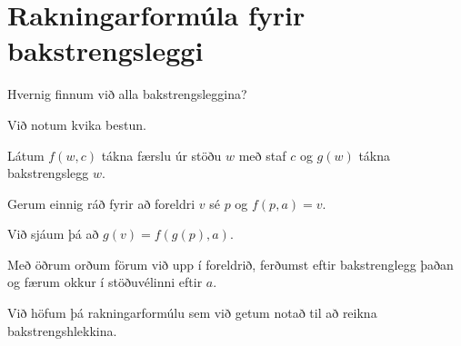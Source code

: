 \section{Rakningarformúla fyrir bakstrengsleggi}
{
    {
        \item<1-> Hvernig finnum við alla bakstrengsleggina?
        \item<2-> Við notum kvika bestun.
        \item<3-> Látum $f(w, c)$ tákna færslu úr stöðu $w$ með staf $c$ og $g(w)$ tákna bakstrengslegg $w$.
        \item<4-> Gerum einnig ráð fyrir að foreldri $v$ sé $p$ og $f(p, a) = v$.
        \item<5-> Við sjáum þá að $g(v) = f(g(p), a)$.
        \item<6-> Með öðrum orðum förum við upp í foreldrið, ferðumst eftir bakstrenglegg þaðan og færum okkur í stöðuvélinni eftir $a$.
        \item<7-> Við höfum þá rakningarformúlu sem við getum notað til að reikna bakstrengshlekkina.
    }
}

